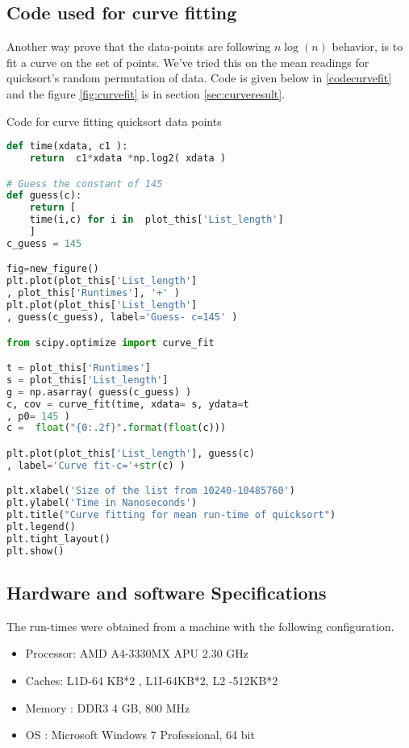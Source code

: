 \documentclass[sigconf, nonacm, natbib, screen, balance=False]{acmart}
\begin{document}
\subsection{Code used for curve fitting}\label{sec:curvefitting}
Another way prove that the data-points are following \textbf{$n\log(n)$} behavior, is to fit a curve on the set of points. We've tried this on the mean readings for quicksort's random permutation of data. Code is given below in \ref{codecurvefit} and the figure \ref{fig:curvefit} is in section \ref{sec:curveresult}.

\begin{listing}
  \caption{Code for curve fitting quicksort data points}
  \label{codecurvefit}
\begin{lstlisting}[language=Python]
def time(xdata, c1 ):
    return  c1*xdata *np.log2( xdata )

# Guess the constant of 145
def guess(c):
    return [ 
    time(i,c) for i in  plot_this['List_length']
    ]
c_guess = 145 

fig=new_figure()
plt.plot(plot_this['List_length']
, plot_this['Runtimes'], '+' )
plt.plot(plot_this['List_length']
, guess(c_guess), label='Guess- c=145' )

from scipy.optimize import curve_fit

t = plot_this['Runtimes']
s = plot_this['List_length']
g = np.asarray( guess(c_guess) )
c, cov = curve_fit(time, xdata= s, ydata=t
, p0= 145 )
c =  float("{0:.2f}".format(float(c)))

plt.plot(plot_this['List_length'], guess(c)
, label='Curve fit-c='+str(c) )

plt.xlabel('Size of the list from 10240-10485760')
plt.ylabel('Time in Nanoseconds')
plt.title("Curve fitting for mean run-time of quicksort")
plt.legend()
plt.tight_layout()
plt.show()
\end{lstlisting}
\end{listing}


\subsection{Hardware and software Specifications}\label{sec:hardwares and softwares}
The run-times were obtained from a machine with the following configuration. 

\begin{itemize}
\item Processor:    AMD A4-3330MX APU  2.30 GHz
\item Caches:       L1D-64 KB*2 , L1I-64KB*2, L2 -512KB*2
\item Memory :      DDR3 4 GB, 800 MHz
\item OS :          Microsoft Windows 7 Professional, 64 bit
\end{itemize}
\end{document}
